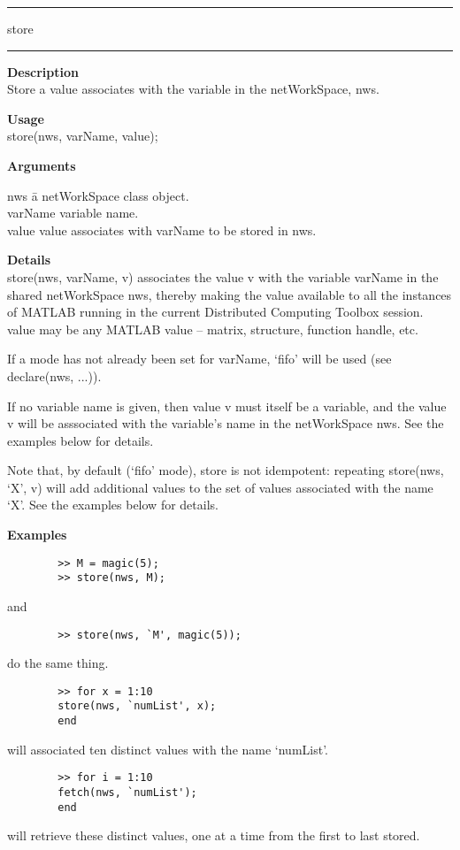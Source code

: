 \rule[0.06in]{6in}{0.01in}
\newline
store
\newline
\rule{6in}{0.01in}
\begin{list}{}{}
	\item {\bf Description}\\
	Store a value associates with the variable in the netWorkSpace, nws.
	\item {\bf Usage}\\
	store(nws, varName, value);
	\item {\bf Arguments}
		\begin{tabbing}
		nws \hspace{2.5cm} \= a netWorkSpace class object.\\
		varName \> variable name.\\
		value \> value associates with varName to be stored in nws. 
		\end{tabbing}
	\item {\bf Details}\\
	store(nws, varName, v) associates the value v with the
	variable varName in the shared netWorkSpace nws, thereby making
	the value available to all the instances of MATLAB running in
	the current Distributed Computing Toolbox session.  value may be
	any MATLAB value -- matrix, structure, function handle, etc.

	If a mode has not already been set for varName, `fifo' will be used (see declare(nws, ...)).

	If no variable name is given, then value v must itself be a variable,
	and the value v will be asssociated with the variable's name in
	the netWorkSpace nws. See the examples below for details.

	Note that, by default (`fifo' mode), store is not idempotent:
	repeating store(nws, `X', v) will add additional values to the
	set of values associated with the name `X'. See the examples below for details.

	\item {\bf Examples}
		\begin{verbatim}
		>> M = magic(5); 
		>> store(nws, M);
		\end{verbatim}
		and
		\begin{verbatim}
		>> store(nws, `M', magic(5));
		\end{verbatim}
		do the same thing. 
	
		\begin{verbatim}
		>> for x = 1:10
		store(nws, `numList', x);
		end
		\end{verbatim}
	
		will associated ten distinct values with the name `numList'.
	
		\begin{verbatim}
		>> for i = 1:10
		fetch(nws, `numList');
		end
		\end{verbatim}
	
		will retrieve these distinct values, one at a time from the
		first to last stored.
\end{list}

